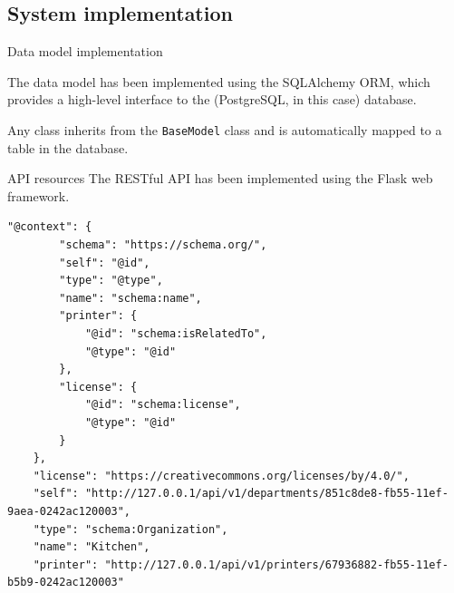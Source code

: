 \subsection[System implementation]{System implementation}

\begin{frame}[allowframebreaks]{Data model implementation}

	The data model has been implemented using the SQLAlchemy ORM, which
	provides a high-level interface to the (PostgreSQL, in this case) database.

	

	Any class inherits from the \texttt{BaseModel} class and is automatically
	mapped to a table in the database.

	\framebreak

	\vspace*{-1\baselineskip}
	

\end{frame}

\newenvironment{slide}[1][]
{%
	\begin{frame}[allowframebreaks,#1]%
		}{%
	\end{frame}%
}

\begin{frame}{API resources}
	The RESTful API has been implemented using the Flask web framework.

	

	\framebreak

	\begin{lstlisting}[caption={\texttt{GET /api/v1/departments/851c8de8-fb55-11ef-9aea-0242ac120003} response}]
	"@context": {
		"schema": "https://schema.org/",
		"self": "@id",
		"type": "@type",
		"name": "schema:name",
		"printer": {
			"@id": "schema:isRelatedTo",
			"@type": "@id"
		},
		"license": {
			"@id": "schema:license",
			"@type": "@id"
		}
	},
	"license": "https://creativecommons.org/licenses/by/4.0/",
	"self": "http://127.0.0.1/api/v1/departments/851c8de8-fb55-11ef-9aea-0242ac120003",
	"type": "schema:Organization",
	"name": "Kitchen",
	"printer": "http://127.0.0.1/api/v1/printers/67936882-fb55-11ef-b5b9-0242ac120003"\end{lstlisting}

\end{frame}


